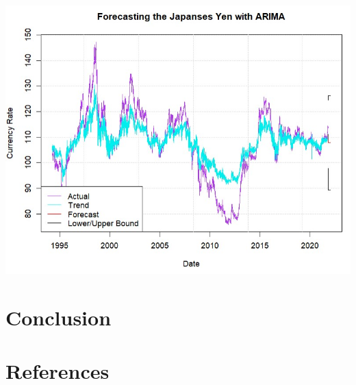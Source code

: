 \documentclass[11pt,preprint, authoryear]{elsarticle}
\let\origfigure\figure
\let\endorigfigure\endfigure
\renewenvironment{figure}[1][2] {
    \expandafter\origfigure\expandafter[H]
} {
    \endorigfigure
}
\numberwithin{equation}{section}
\numberwithin{figure}{section}
\numberwithin{table}{section}
\begin{document}
\begin{figure}
\centering
\includegraphics[scale=0.5]{fore3.jpg}
\caption{caption}
\label{for2}
\end{figure}

\hypertarget{conclusion}{%
\section{Conclusion}\label{conclusion}}

\newpage

\hypertarget{references}{%
\section*{References}\label{references}}
\end{document}
